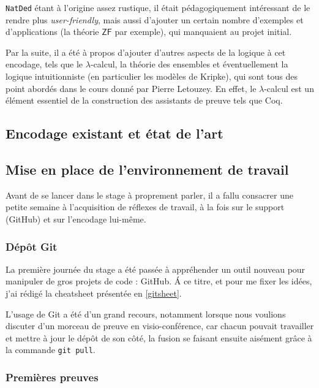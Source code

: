 \documentclass[a4paper]{article}
\newcommand{\ZF}{\mathsf{ZF}}
\theoremstyle{remark}
\theoremstyle{remark}
\theoremstyle{remark}
\theoremstyle{definition}
\theoremstyle{definition}
\theoremstyle{definition}
\begin{document}
\verb+NatDed+ étant à l'origine assez rustique, il était pédagogiquement intéressant de le rendre plus \textit{user-friendly}, mais aussi d'ajouter un certain nombre d'exemples et d'applications (la théorie $\ZF$ par exemple), qui manquaient au projet initial.

Par la suite, il a été à propos d'ajouter d'autres aspects de la logique à cet encodage, tels que le $\lambda$-calcul, la théorie des ensembles et éventuellement la logique intuitionniste (en particulier les modèles de Kripke), qui sont tous des point abordés dans le cours donné par Pierre Letouzey. En effet, le $\lambda$-calcul est un élément essentiel de la construction des assistants de preuve tels que Coq.

\subsection{Encodage existant et état de l'art}


\subsection{Mise en place de l'environnement de travail}

Avant de se lancer dans le stage à proprement parler, il a fallu consacrer une petite semaine à l'acquisition de réflexes de travail, à la fois sur le support (GitHub) et sur l'encodage lui-même.

\subsubsection{Dépôt Git}

La première journée du stage a été passée à appréhender un outil nouveau pour manipuler de gros projets de code : GitHub. \'A ce titre, et pour me fixer les idées, j'ai rédigé la cheatsheet présentée en \ref{gitsheet}.

L'usage de Git a été d'un grand recours, notamment lorsque nous voulions discuter d'un morceau de preuve en visio-conférence, car chacun pouvait travailler et mettre à jour le dépôt de son côté, la fusion se faisant ensuite aisément grâce à la commande \verb+git pull+.

\subsubsection{Premières preuves}
\end{document}
